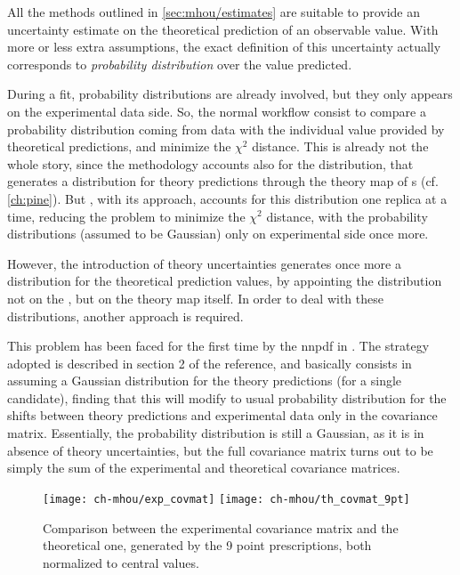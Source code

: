 
All the methods outlined in \cref{sec:mhou/estimates} are suitable to provide
an uncertainty estimate on the theoretical prediction of an observable value.
With more or less extra assumptions, the exact definition of this uncertainty
actually corresponds to \textit{probability distribution} over the value
predicted.

During a \pdf fit, probability distributions are already involved, but they
only appears on the experimental data side.
So, the normal workflow consist to compare a probability distribution coming
from data with the individual value provided by theoretical predictions, and
minimize the $\chi^2$ distance.
%
This is already not the whole story, since the \nnpdf methodology accounts also
for the \pdf distribution, that generates a distribution for theory predictions
through the theory map of \fktab{}s (cf. \cref{ch:pine}).
%
But \nnpdf, with its \mc approach, accounts for this distribution one \pdf
replica at a time, reducing the problem to minimize the $\chi^2$ distance, with
the probability distributions (assumed to be Gaussian) only on experimental
side once more.

However, the introduction of theory uncertainties generates once more a
distribution for the theoretical prediction values, by appointing the
distribution not on the \pdf, but on the theory map itself.
%
In order to deal with these distributions, another approach is required.

This problem has been faced for the first time by the \acrlong{nnpdf} in
\cite{NNPDF:2019ubu}.
%
The strategy adopted is described in section 2 of the reference, and basically
consists in assuming a Gaussian distribution for the theory predictions (for a
single \pdf candidate), finding that this will modify to usual probability
distribution for the shifts between theory predictions and experimental data
only in the covariance matrix.
%
Essentially, the probability distribution is still a Gaussian, as it is in
absence of theory uncertainties, but the full covariance matrix turns out to be
simply the sum of the experimental and theoretical covariance matrices.

\begin{figure}
	\centering
	\texttt{[image: ch-mhou/exp\_covmat]}
	\texttt{[image: ch-mhou/th\_covmat\_9pt]}
	\caption{
		Comparison between the experimental covariance matrix and the
		theoretical one, generated by the 9 point prescriptions, both
		normalized to central values.
	}
	\label{fig:mhou/covmats}
\end{figure}

